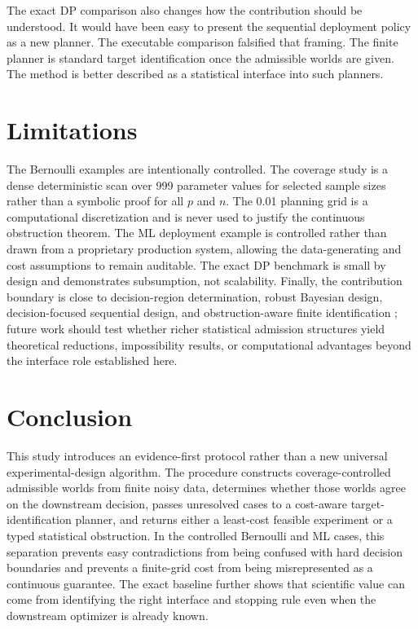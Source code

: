 \documentclass[11pt]{article}
\begin{document}
The exact DP comparison also changes how the contribution should be understood. It would have been easy to present the sequential deployment policy as a new planner. The executable comparison falsified that framing. The finite planner is standard target identification once the admissible worlds are given. The method is better described as a statistical interface into such planners.

\section{Limitations}
The Bernoulli examples are intentionally controlled. The coverage study is a dense deterministic scan over 999 parameter values for selected sample sizes rather than a symbolic proof for all $p$ and $n$. The 0.01 planning grid is a computational discretization and is never used to justify the continuous obstruction theorem. The ML deployment example is controlled rather than drawn from a proprietary production system, allowing the data-generating and cost assumptions to remain auditable. The exact DP benchmark is small by design and demonstrates subsumption, not scalability. Finally, the contribution boundary is close to decision-region determination, robust Bayesian design, decision-focused sequential design, and obstruction-aware finite identification \parencite{javdani2014,go2022,wan2026,brown2026}; future work should test whether richer statistical admission structures yield theoretical reductions, impossibility results, or computational advantages beyond the interface role established here.

\section{Conclusion}
This study introduces an evidence-first protocol rather than a new universal experimental-design algorithm. The procedure constructs coverage-controlled admissible worlds from finite noisy data, determines whether those worlds agree on the downstream decision, passes unresolved cases to a cost-aware target-identification planner, and returns either a least-cost feasible experiment or a typed statistical obstruction. In the controlled Bernoulli and ML cases, this separation prevents easy contradictions from being confused with hard decision boundaries and prevents a finite-grid cost from being misrepresented as a continuous guarantee. The exact baseline further shows that scientific value can come from identifying the right interface and stopping rule even when the downstream optimizer is already known.
\end{document}
